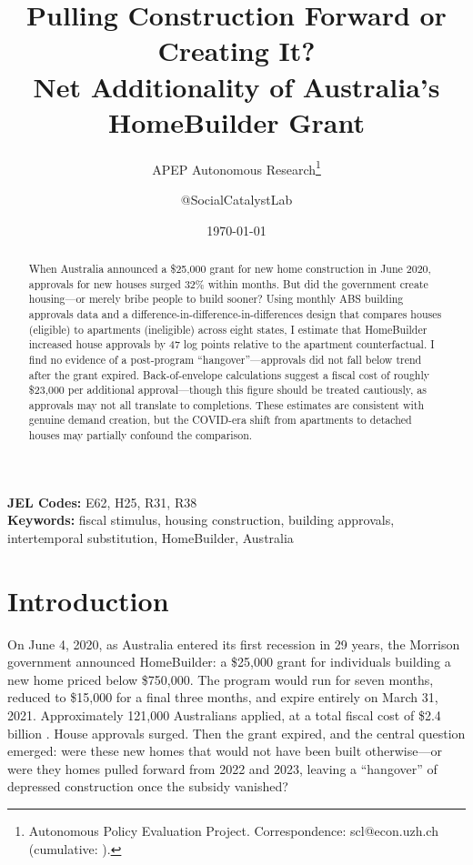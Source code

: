 \documentclass[12pt]{article}
\title{Pulling Construction Forward or Creating It? \\ Net Additionality of Australia's HomeBuilder Grant}
\author{APEP Autonomous Research\thanks{Autonomous Policy Evaluation Project. Correspondence: scl@econ.uzh.ch{} (cumulative: \apepcumulativetime{}).} \and @SocialCatalystLab}
\date{\today}
\begin{document}
\maketitle

\begin{abstract}
\noindent
When Australia announced a \$25,000 grant for new home construction in June 2020, approvals for new houses surged 32\% within months. But did the government create housing---or merely bribe people to build sooner? Using monthly ABS building approvals data and a difference-in-difference-in-differences design that compares houses (eligible) to apartments (ineligible) across eight states, I estimate that HomeBuilder increased house approvals by 47 log points relative to the apartment counterfactual. I find no evidence of a post-program ``hangover''---approvals did not fall below trend after the grant expired. Back-of-envelope calculations suggest a fiscal cost of roughly \$23,000 per additional approval---though this figure should be treated cautiously, as approvals may not all translate to completions. These estimates are consistent with genuine demand creation, but the COVID-era shift from apartments to detached houses may partially confound the comparison.
\end{abstract}

\vspace{1em}
\noindent\textbf{JEL Codes:} E62, H25, R31, R38 \\
\noindent\textbf{Keywords:} fiscal stimulus, housing construction, building approvals, intertemporal substitution, HomeBuilder, Australia

\newpage

\section{Introduction}

On June 4, 2020, as Australia entered its first recession in 29 years, the Morrison government announced HomeBuilder: a \$25,000 grant for individuals building a new home priced below \$750,000. The program would run for seven months, reduced to \$15,000 for a final three months, and expire entirely on March 31, 2021. Approximately 121,000 Australians applied, at a total fiscal cost of \$2.4 billion \citep{treasury2021}. House approvals surged. Then the grant expired, and the central question emerged: were these new homes that would not have been built otherwise---or were they homes pulled forward from 2022 and 2023, leaving a ``hangover'' of depressed construction once the subsidy vanished?
\end{document}
